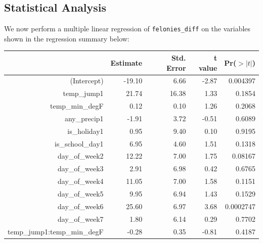 \documentclass[11pt,notitlepage]{article}
\newenvironment{codeSmall}%
   {\par\noindent\adjustbox{margin=1ex,bgcolor=shadecolor,margin=0ex \medskipamount}\bgroup\minipage\linewidth\verbatim\footnotesize}%
   {\endverbatim\endminipage\egroup}
\begin{document}
\subsection{Statistical Analysis}
\label{sec:modelFeloniesDiffMultipleRegression}


We now perform a multiple linear regression of \texttt{felonies_diff} on the variables shown in the regression summary below:




\begin{table}[ht]
\footnotesize
\centering
\begin{tabular}{rrrrr}
  \hline
 & Estimate & Std. Error & t value & Pr($>|t|$) \\ 
  \hline
(Intercept) & -19.10 & 6.66 & -2.87 & 0.004397 \\ 
  temp\_jump1 & 21.74 & 16.38 & 1.33 & 0.1854 \\ 
  temp\_min\_degF & 0.12 & 0.10 & 1.26 & 0.2068 \\ 
  any\_precip1 & -1.91 & 3.72 & -0.51 & 0.6089 \\ 
  is\_holiday1 & 0.95 & 9.40 & 0.10 & 0.9195 \\ 
  is\_school\_day1 & 6.95 & 4.60 & 1.51 & 0.1318 \\ 
  day\_of\_week2 & 12.22 & 7.00 & 1.75 & 0.08167 \\ 
  day\_of\_week3 & 2.91 & 6.98 & 0.42 & 0.6765 \\ 
  day\_of\_week4 & 11.05 & 7.00 & 1.58 & 0.1151 \\ 
  day\_of\_week5 & 9.95 & 6.94 & 1.43 & 0.1529 \\ 
  day\_of\_week6 & 25.60 & 6.97 & 3.68 & 0.0002747 \\ 
  day\_of\_week7 & 1.80 & 6.14 & 0.29 & 0.7702 \\ 
  temp\_jump1:temp\_min\_degF & -0.28 & 0.35 & -0.81 & 0.4187 \\ 
   \hline
\end{tabular}
\end{table}
\end{document}
